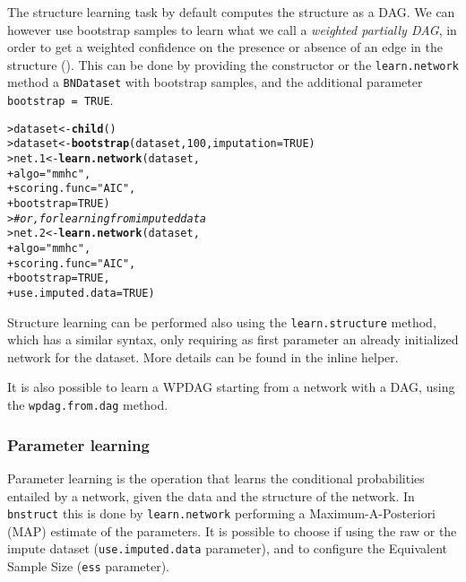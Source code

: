 \documentclass{article}\usepackage[]{graphicx}\usepackage[]{color}
\makeatletter
\newcommand{\hlnum}[1]{\textcolor[rgb]{0.686,0.059,0.569}{#1}}%
\newcommand{\hlstr}[1]{\textcolor[rgb]{0.192,0.494,0.8}{#1}}%
\newcommand{\hlcom}[1]{\textcolor[rgb]{0.678,0.584,0.686}{\textit{#1}}}%
\newcommand{\hlstd}[1]{\textcolor[rgb]{0.345,0.345,0.345}{#1}}%
\newcommand{\hlkwb}[1]{\textcolor[rgb]{0.69,0.353,0.396}{#1}}%
\newcommand{\hlkwc}[1]{\textcolor[rgb]{0.333,0.667,0.333}{#1}}%
\newcommand{\hlkwd}[1]{\textcolor[rgb]{0.737,0.353,0.396}{\textbf{#1}}}%
\newenvironment{kframe}{%
 \def\at@end@of@kframe{}%
 \ifinner\ifhmode%
  \def\at@end@of@kframe{\end{minipage}}%
  \begin{minipage}{\columnwidth}%
 \fi\fi%
 \def\FrameCommand##1{\hskip\@totalleftmargin \hskip-\fboxsep
 \colorbox{shadecolor}{##1}\hskip-\fboxsep
     \hskip-\linewidth \hskip-\@totalleftmargin \hskip\columnwidth}%
 \MakeFramed {\advance\hsize-\width
   \@totalleftmargin\z@ \linewidth\hsize
   \@setminipage}}%
 {\par\unskip\endMakeFramed%
 \at@end@of@kframe}
\newenvironment{knitrout}{}{} %
\newcommand{\Robject}[1]{{\texttt{#1}}}
\newcommand{\Rpackage}[1]{{\texttt{#1}}}
\newcommand{\Rmethod}[1]{{\texttt{#1}}}
\newcommand{\Rfunarg}[1]{{\texttt{#1}}}
\makeatother
\begin{document}
The structure learning task by default computes the structure as a DAG. We can however use
bootstrap samples to learn what we call a \textit{weighted partially DAG}, in order to get a weighted confidence on the presence or
absence of an edge in the structure (\citet*{friedman1999data}). This can be done by providing the constructor or the \Rmethod{learn.network}
method a \Robject{BNDataset} with bootstrap samples, and the additional parameter \Rfunarg{bootstrap = TRUE}.

\begin{knitrout}
\color{fgcolor}\begin{kframe}
\begin{alltt}
\hlstd{> }\hlstd{dataset} \hlkwb{<-} \hlkwd{child}\hlstd{()}
\hlstd{> }\hlstd{dataset} \hlkwb{<-} \hlkwd{bootstrap}\hlstd{(dataset,} \hlnum{100}\hlstd{,} \hlkwc{imputation} \hlstd{=} \hlnum{TRUE}\hlstd{)}
\hlstd{> }\hlstd{net.1}   \hlkwb{<-} \hlkwd{learn.network}\hlstd{(dataset,}
\hlstd{+ }                         \hlkwc{algo} \hlstd{=} \hlstr{"mmhc"}\hlstd{,}
\hlstd{+ }                         \hlkwc{scoring.func} \hlstd{=} \hlstr{"AIC"}\hlstd{,}
\hlstd{+ }                         \hlkwc{bootstrap} \hlstd{=} \hlnum{TRUE}\hlstd{)}
\hlstd{> }\hlcom{# or, for learning from imputed data}
\hlstd{> }\hlstd{net.2}   \hlkwb{<-} \hlkwd{learn.network}\hlstd{(dataset,}
\hlstd{+ }                         \hlkwc{algo} \hlstd{=} \hlstr{"mmhc"}\hlstd{,}
\hlstd{+ }                         \hlkwc{scoring.func} \hlstd{=} \hlstr{"AIC"}\hlstd{,}
\hlstd{+ }                         \hlkwc{bootstrap} \hlstd{=} \hlnum{TRUE}\hlstd{,}
\hlstd{+ }                         \hlkwc{use.imputed.data} \hlstd{=} \hlnum{TRUE}\hlstd{)}
\end{alltt}
\end{kframe}
\end{knitrout}

Structure learning can be performed also using the \Rmethod{learn.structure} method, which has a similar syntax, only requiring as
first parameter an already initialized network for the dataset. More details can be found in the inline helper.

It is also possible to learn a WPDAG starting from a network with a DAG, using the \Rmethod{wpdag.from.dag} method.

\subsubsection{Parameter learning}
Parameter learning is the operation that learns the conditional probabilities entailed by a network,
given the data and the structure of the network. In \Rpackage{bnstruct} this is done by \Rmethod{learn.network}
performing a Maximum-A-Posteriori (MAP) estimate of the parameters. It is possible to choose if using the raw
or the impute dataset (\Rfunarg{use.imputed.data} parameter), and to configure the
Equivalent Sample Size (\Rfunarg{ess} parameter).
\end{document}
